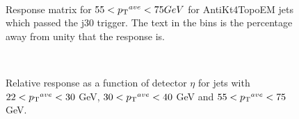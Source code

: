 \begin{figure}
\centering
\mbox{
}
\caption[]{
Response matrix for $55<\mbox{$\mbox{$p_{\rm T}$}{}^{ave}$}{}<75GeV$ for AntiKt4TopoEM jets which passed the j30 trigger. 
The text in the bins is the percentage away from unity that the response is.
\label{JetPerf:ResponseMatrix_55_75_j30}}
\end{figure}


\begin{figure}
\centering
\mbox{
}
\caption[]{
Relative response as a function of detector $\eta$ for jets with $22<\mbox{$\mbox{$p_{\rm T}$}{}^{ave}$}{}<30$ GeV, $30<\mbox{$\mbox{$p_{\rm T}$}{}^{ave}$}{}<40$ GeV and $55<\mbox{$\mbox{$p_{\rm T}$}{}^{ave}$}{}<75$ GeV.
\label{JetPerf:PtComp}}
\end{figure}


